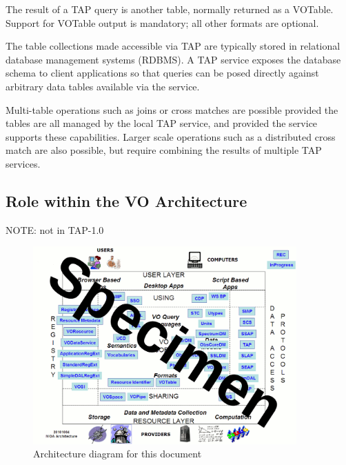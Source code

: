 \documentclass[11pt,letter]{ivoa}
\begin{document}
The result of a TAP query is another table, normally returned as a VOTable. 
Support for VOTable output is mandatory; all other formats are optional.

The table collections made accessible via TAP are typically stored in relational 
database management systems (RDBMS). A TAP service exposes the database schema 
to client applications so that queries can be posed directly against arbitrary 
data tables available via the service.

Multi-table operations such as joins or cross matches are possible provided the 
tables are all managed by the local TAP service, and provided the service 
supports these capabilities.  Larger scale operations such as a distributed 
cross match are also possible, but require combining the results of multiple TAP 
services.

\subsection{Role within the VO Architecture}

NOTE: not in TAP-1.0

\begin{figure}
\centering


\includegraphics[width=0.9\textwidth]{archdiag.png}
\caption{Architecture diagram for this document}
\label{fig:archdiag}
\end{figure}
\end{document}

